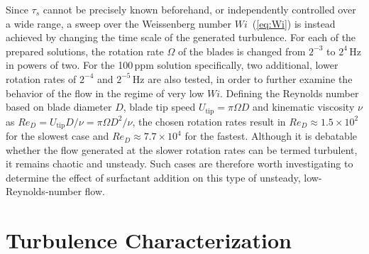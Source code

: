 \documentclass[aps,prfluids,groupedaddress,showkeys,11pt,tightenlines]{revtex4-2}
\begin{document}
Since $\tau_s$ cannot be precisely known beforehand, or independently controlled over a wide range, a sweep over the Weissenberg number $Wi$~(\ref{eq:Wi}) is instead achieved by changing the time scale of the generated turbulence. For each of the prepared solutions, the rotation rate $\Omega$ of the blades is changed from $2^{-3}$ to $2^{4}$\,Hz in powers of two. For the 100\,ppm solution specifically, two additional, lower rotation rates of $2^{-4}$ and $2^{-5}$\,Hz are also tested, in order to further examine the behavior of the flow in the regime of very low $Wi$. Defining the Reynolds number based on blade diameter $D$, blade tip speed $U_{\mathrm{tip}}=\pi\Omega D$ and kinematic viscosity $\nu$ as $Re_D = U_{\mathrm{tip}}D/\nu=\pi\Omega D^2/\nu$, the chosen rotation rates result in $Re_D\approx1.5\times10^{2}$ for the slowest case and $Re_D\approx7.7\times10^4$ for the fastest. Although it is debatable whether the flow generated at the slower rotation rates can be termed turbulent, it remains chaotic and unsteady. Such cases are therefore worth investigating to determine the effect of surfactant addition on this type of unsteady, low-Reynolds-number flow.



\section{Turbulence Characterization\label{sec:Turbchar}}
\end{document}
